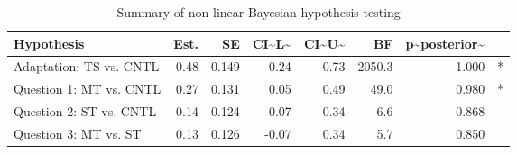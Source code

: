 \begin{table}

\caption{\label{tab:plots for Exp 1b}Summary of non-linear Bayesian hypothesis testing}
\centering
\begin{tabular}[t]{l|r|r|r|r|r|r|l}
\hline
Hypothesis & Est. & SE & CI\textasciitilde{}L\textasciitilde{} & CI\textasciitilde{}U\textasciitilde{} & BF & p\textasciitilde{}posterior\textasciitilde{} & \\
\hline
Adaptation: TS vs. CNTL & 0.48 & 0.149 & 0.24 & 0.73 & 2050.3 & 1.000 & *\\
\hline
Question 1: MT vs. CNTL & 0.27 & 0.131 & 0.05 & 0.49 & 49.0 & 0.980 & *\\
\hline
Question 2: ST vs. CNTL & 0.14 & 0.124 & -0.07 & 0.34 & 6.6 & 0.868 & \\
\hline
Question 3: MT vs. ST & 0.13 & 0.126 & -0.07 & 0.34 & 5.7 & 0.850 & \\
\hline
\end{tabular}
\end{table}
